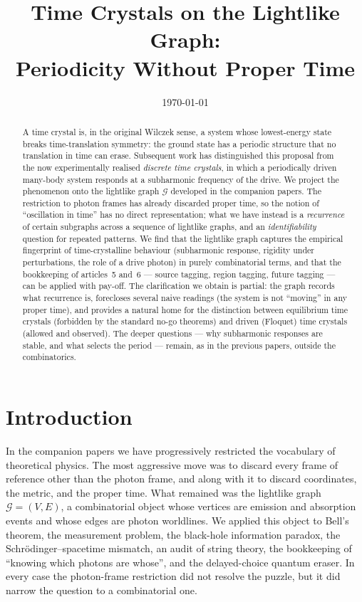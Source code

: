 \documentclass[11pt]{article}
\title{Time Crystals on the Lightlike Graph:\\
Periodicity Without Proper Time}
\date{\today}
\begin{document}
\maketitle

\begin{abstract}
A time crystal is, in the original Wilczek sense, a system whose lowest-energy state breaks time-translation symmetry: the ground state has a periodic structure that no translation in time can erase. Subsequent work has distinguished this proposal from the now experimentally realised \emph{discrete time crystals}, in which a periodically driven many-body system responds at a subharmonic frequency of the drive. We project the phenomenon onto the lightlike graph $\mathcal{G}$ developed in the companion papers. The restriction to photon frames has already discarded proper time, so the notion of ``oscillation in time'' has no direct representation; what we have instead is a \emph{recurrence} of certain subgraphs across a sequence of lightlike graphs, and an \emph{identifiability} question for repeated patterns. We find that the lightlike graph captures the empirical fingerprint of time-crystalline behaviour (subharmonic response, rigidity under perturbations, the role of a drive photon) in purely combinatorial terms, and that the bookkeeping of articles~5 and~6 --- source tagging, region tagging, future tagging --- can be applied with pay-off. The clarification we obtain is partial: the graph records what recurrence is, forecloses several naive readings (the system is not ``moving'' in any proper time), and provides a natural home for the distinction between equilibrium time crystals (forbidden by the standard no-go theorems) and driven (Floquet) time crystals (allowed and observed). The deeper questions --- why subharmonic responses are stable, and what selects the period --- remain, as in the previous papers, outside the combinatorics.
\end{abstract}

\section{Introduction}

In the companion papers we have progressively restricted the vocabulary of theoretical physics. The most aggressive move was to discard every frame of reference other than the photon frame, and along with it to discard coordinates, the metric, and the proper time. What remained was the lightlike graph $\mathcal{G} = (V, E)$, a combinatorial object whose vertices are emission and absorption events and whose edges are photon worldlines. We applied this object to Bell's theorem, the measurement problem, the black-hole information paradox, the Schr\"odinger--spacetime mismatch, an audit of string theory, the bookkeeping of ``knowing which photons are whose'', and the delayed-choice quantum eraser. In every case the photon-frame restriction did not resolve the puzzle, but it did narrow the question to a combinatorial one.
\end{document}
